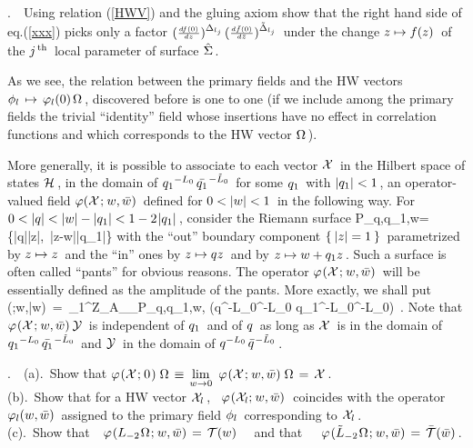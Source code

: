 .\ \ Using relation (\ref{HWV}) and the
gluing axiom show that the right hand side of eq.\s\s(\ref{xxx})
picks only a factor \s$({_{df(0)}\over^{dz}})^{\Delta_{l_j}}
\hspace{0.05cm}({_{d\bar f(0)}\over^{d\bar z}})^{\tilde\Delta_{l_j}}\hspace{0.05cm}$
under the change \s$z\mapsto f(z)\hspace{0.05cm}$ of the \s$j^{\rm \hspace{0.05cm} th}\hspace{0.05cm}$
local parameter of surface \s$\hat\Sigma\hspace{0.05cm}$.
\vs 0.6cm


\no As we see, the relation between the primary fields
and the HW vectors \s$\phi_l\hspace{0.05cm}\mapsto\hspace{0.05cm}\varphi_l(0)\hspace{0.05cm}\Omega\hspace{0.05cm}$,
\s discovered before is one to one (if we include
among the primary fields the trivial ``identity'' field
whose insertions have no effect in correlation functions
and which corresponds to the HW vector \s$\Omega\hspace{0.05cm}$).
\vs 0.6cm

\vs 0.4cm

More generally, it is possible to associate to each vector \s${\cal X}\hspace{0.05cm}$
in the Hilbert space of states \s${\cal H}\hspace{0.05cm}$, \s in the domain
of \s${q_1}^{-L_0}\hspace{0.05cm}{\bar{q_1}}^{\hspace{0.025cm}-\tilde L_0}\hspace{0.05cm}$ for some \s${q_1}
\hspace{0.05cm}$ with \s$|q_1|<1\hspace{0.05cm}$, \s an operator-valued
field \s$\varphi({\cal X}\hspace{0.025cm};\hspace{0.025cm} w,\bar w)\hspace{0.05cm}$ defined for \s$0<|w|<1\s$
in the following way. For
\s$0<|q|<|w|-|q_1|<1-2\m|q_1|\s$, consider the Riemann surface
\qq
P_{q,q_1,w}\s=\s\{\m\s|q|\leq|z|,\ |z-w|\geq|q_1|\s\m\}
\non
\qqq
with the ``out'' boundary component \s$\{\s\m|z|=1\s\m\}\s$
parametrized by \s$z\mapsto z\hspace{0.05cm}$ and the ``in'' ones by \s$
z\mapsto qz\hspace{0.05cm}$ and by \s$z\mapsto w+q_1z\hspace{0.05cm}$. \s Such a surface is
often called ``pants'' for obvious reasons.
The operator \s$\varphi\hspace{0.025cm}({\cal X}\hspace{0.025cm};\hspace{0.025cm} w,\bar w)\hspace{0.05cm}$ will
be essentially defined as the amplitude of the pants.
More exactly, we shall put
\qq
\varphi\m(\CX\m;\m w,\bar w)\s\m\CY\
=\ {_1\over^{Z_\ga}}\s\s\m A_{_{P_{q,q_1,w}\m,\m \ga}}
\s\s(\s q^{-L_0}^{\m-\tilde L_0}\s\CY\s\otimes\s
{q_1}^{-L_0}^{\m-\tilde L_0}\s\CX\s)\ .
\non
\qqq
Note that \s$\varphi\m(\CX\m;\m w,\bar w)\m\s\CY\s$
is independent of \s$q_1\hspace{0.05cm}$ and of \s$q\hspace{0.05cm}$ as long as
\s${\cal X}\hspace{0.05cm}$ is in the domain of
\s${q_1}^{-L_0}\hspace{0.05cm}{\bar{q_1}}^{\hspace{0.025cm}-\tilde L_0}\hspace{0.05cm}$
and \s${\cal Y}\hspace{0.05cm}$ in the domain
of \s$q^{-L_0}\hspace{0.05cm}{\bar q}^{\hspace{0.025cm}-\tilde L_0}\hspace{0.05cm}$.
\vs 0.6cm

.\ \ (a).\ \s Show that \s$\varphi\m(\CX\m;\m 0\m)
\s\s\Omega\s
\equiv\s\lim\limits_{w\to 0}\ \varphi\m(\CX\m;\m w,
\bar w)\s\s\Omega\s=\s\CX\s$.\hfill\\
(b).\ \s Show that for a HW vector \s${\cal X}_l\hspace{0.05cm}$\m,
\s\ $\varphi\m(\CX_l;\m w,\bar w)\s\s$
coincides with the operator \s$\varphi_l(w,\bar w)\hspace{0.05cm}$
assigned to the primary field \s$\phi_l\hspace{0.05cm}$
corresponding to \s${\cal X}_l\hspace{0.05cm}$.\hfill\\
(c).\ \s Show that\s$\ \ \
\varphi\hspace{0.025cm}(L_{-2}\hspace{0.025cm}\Omega\hspace{0.025cm};\hspace{0.025cm} w,\bar w)
\hspace{0.05cm}=\hspace{0.05cm}{\cal T}(w)\hspace{0.05cm}\ $ \ and that\ \ \ \s$\varphi
\hspace{0.025cm}(\tilde L_{-2}\hspace{0.025cm}\Omega\hspace{0.025cm};\hspace{0.025cm} w,\bar w)\hspace{0.05cm}=\hspace{0.05cm}
{\bar{{\cal T}}}(\bar w)\hspace{0.05cm}$.
\vs 0.6cm

